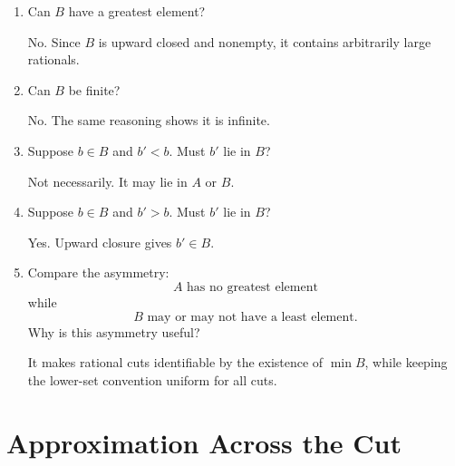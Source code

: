 \documentclass{self-check}
\begin{document}
\begin{enumerate}[label=\arabic{*}., itemsep=10pt]
    \begin{answer}
      Exactly when the cut is induced by a rational number.
    \end{answer}
  \item Can \(B\) have a greatest element?

    \begin{answer}
      No. Since \(B\) is upward closed and nonempty, it contains arbitrarily large rationals.
    \end{answer}
  \item Can \(B\) be finite?

    \begin{answer}
      No. The same reasoning shows it is infinite.
    \end{answer}
  \item Suppose \(b\in B\) and \(b'<b\). Must \(b'\) lie in \(B\)?

    \begin{answer}
      Not necessarily. It may lie in \(A\) or \(B\).
    \end{answer}
  \item Suppose \(b\in B\) and \(b'>b\). Must \(b'\) lie in \(B\)?

    \begin{answer}
      Yes. Upward closure gives \(b'\in B\).
    \end{answer}
  \item Compare the asymmetry:
    \[ A\text{ has no greatest element} \]
    while
    \[ B\text{ may or may not have a least element}. \]
    Why is this asymmetry useful?

    \begin{answer}
      It makes rational cuts identifiable by the existence of \(\min B\), while keeping the lower-set convention uniform for all cuts.
    \end{answer}
\end{enumerate}

\section{Approximation Across the Cut}
\end{document}
